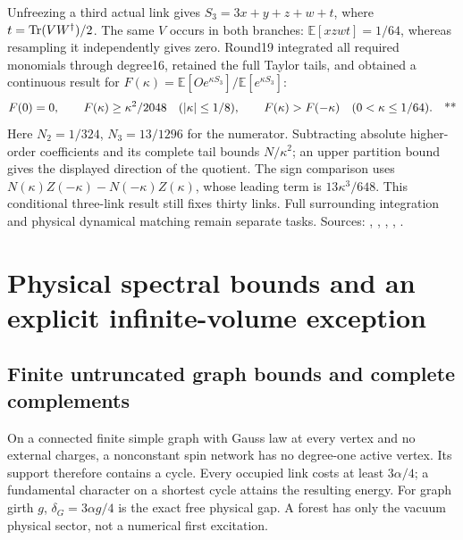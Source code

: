 Unfreezing a third actual link gives
\(S_3=3x+y+z+w+t\), where \(t=\operatorname{Tr}(VW^\dagger)/2\).
The same \(V\) occurs in both branches:
\(\mathbb E[xzwt]=1/64\), whereas resampling it independently gives zero.
Round19 integrated all required monomials through degree16, retained the
full Taylor tails, and obtained a continuous result for
\(F(\kappa)=\mathbb E[Oe^{\kappa S_3}]/\mathbb E[e^{\kappa S_3}]\):
\begin{equation}
 F(0)=0,\qquad F(\kappa)\ge\kappa^2/2048
 \quad(|\kappa|\le1/8),\qquad
 F(\kappa)>F(-\kappa)\quad(0<\kappa\le1/64).
 \quad\text{**}
 \label{eq:middle-static-sign}
\end{equation}
Here \(N_2=1/324\), \(N_3=13/1296\) for the numerator.
Subtracting absolute higher-order coefficients and its complete tail
bounds \(N/\kappa^2\); an upper partition bound gives the displayed
direction of the quotient. The sign comparison uses
\(N(\kappa)Z(-\kappa)-N(-\kappa)Z(\kappa)\), whose leading term is
\(13\kappa^3/648\). This conditional three-link result still fixes thirty
links. Full surrounding integration and physical dynamical matching remain
separate tasks. Sources:
,
,
,
,
.

\section{Physical spectral bounds and an explicit infinite-volume exception}
\label{sec:middle-spectral}

\subsection{Finite untruncated graph bounds and complete complements \workstar}
\label{sec:middle-finite-gap}

On a connected finite simple graph with Gauss law at every vertex and no
external charges, a nonconstant spin network has no degree-one active
vertex. Its support therefore contains a cycle. Every occupied link costs
at least \(3\alpha/4\); a fundamental character on a shortest cycle
attains the resulting energy. For graph girth \(g\),
\(\delta_G=3\alpha g/4\) is the exact free physical gap. A forest has only
the vacuum physical sector, not a numerical first excitation.

